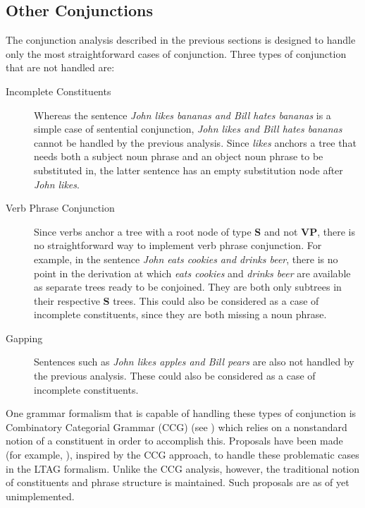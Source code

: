 \subsection{Other Conjunctions}
The conjunction analysis described in the previous sections is designed
to handle only the most straightforward cases of conjunction.  Three
types of conjunction that are not handled are:
\begin{description}
\item [Incomplete Constituents] Whereas the sentence 
{\it John likes bananas and Bill hates bananas} is a simple
case of sentential conjunction, {\it John likes and Bill hates bananas}
cannot be handled by the previous analysis.  Since {\it likes} 
anchors a tree that needs both a subject noun phrase and an object noun
phrase to be substituted in, the latter sentence has an empty
substitution node after {\it John likes}.  

\item [Verb Phrase Conjunction] Since verbs anchor a tree with a root node 
of type {\bf S} and not {\bf VP},
there is no straightforward way to implement verb phrase conjunction.
For example, in the sentence {\it John eats cookies and drinks beer},
there is no point in the derivation at which {\it eats cookies} and
{\it drinks beer} are available as separate trees ready to be conjoined.
They are both only subtrees in their respective {\bf S} trees.  This could
also be considered as a case of incomplete constituents, since
they are both missing a noun phrase.

\item [Gapping]
Sentences such as {\it John likes apples and Bill pears} are also not
handled by the previous analysis.  These could also be considered as a case
of incomplete constituents.
\end{description}

One grammar formalism that is capable of handling these types of 
conjunction is Combinatory Categorial Grammar (CCG) (see \cite{steedman90})
which relies on a nonstandard notion of a constituent in order to accomplish
this.  Proposals have been made (for example, \cite{joshischabes91}),
inspired by the CCG approach, to handle these problematic cases in the
LTAG formalism.  Unlike the CCG analysis, however, the traditional notion
of constituents and phrase structure is maintained.  Such proposals are
as of yet unimplemented.




